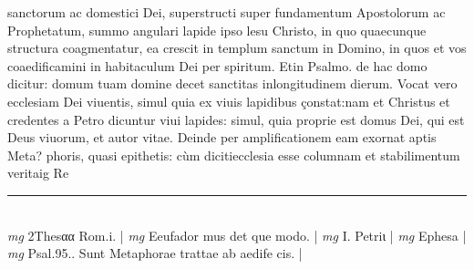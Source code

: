 \documentclass{article}
\begin{document}
\begin{pages}
sanctorum ac domestici Dei, superstructi super fundamentum Apostolorum ac Prophetatum, summo angulari lapide ipso lesu Christo, in quo quaecunque structura coagmentatur, ea crescit in templum sanctum in Domino, in quos et vos coaedificamini in habitaculum Dei per spiritum. Etin Psalmo. de hac domo dicitur: domum tuam domine decet sanctitas inlongitudinem dierum. Vocat vero ecclesiam Dei viuentis, simul quia ex viuis lapidibus çonstat:nam et Christus et credentes a Petro dicuntur viui lapides: simul, quia proprie est domus Dei, qui est Deus viuorum, et autor vitae. Deinde per amplificationem eam exornat aptis Meta? phoris, quasi epithetis: cùm dicitiecclesia esse columnam et stabilimentum veritaig Re\pend
\vspace{0.5cm}\noindent
\vspace{0.2cm}\rule{1cm}{0.2pt}\\ 
\hspace{0.2cm}\textit{mg}
\footnotesize 2Thesαα Rom.i. 
\normalsize| 
\hspace{0.2cm}\textit{mg}
\footnotesize Eeufador mus det que modo. 
\normalsize| 
\hspace{0.2cm}\textit{mg}
\footnotesize I. Petriι 
\normalsize| 
\hspace{0.2cm}\textit{mg}
\footnotesize Ephesa 
\normalsize| 
\hspace{0.2cm}\textit{mg}
\footnotesize Psal.95.. Sunt Metaphorae trattae ab aedife cis. 
\normalsize| 

\end{pages}
\end{document}
